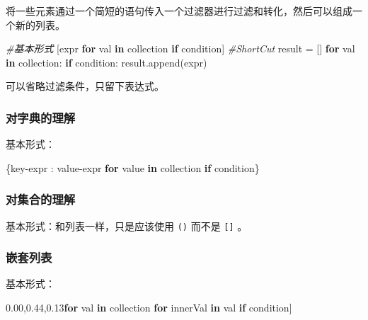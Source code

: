 \documentclass[utf-8]{ctexart}
\newenvironment{Shaded}{}{}
\newcommand{\KeywordTok}[1]{\textcolor[rgb]{0.00,0.44,0.13}{\textbf{#1}}}
\newcommand{\CommentTok}[1]{\textcolor[rgb]{0.38,0.63,0.69}{\textit{#1}}}
\newcommand{\ControlFlowTok}[1]{\textcolor[rgb]{0.00,0.44,0.13}{\textbf{#1}}}
\newcommand{\OperatorTok}[1]{\textcolor[rgb]{0.40,0.40,0.40}{#1}}
\newcommand{\NormalTok}[1]{#1}
\begin{document}
将一些元素通过一个简短的语句传入一个过滤器进行过滤和转化，然后可以组成一个新的列表。

\begin{Shaded}
\begin{Highlighting}[]
\CommentTok{#基本形式}
\NormalTok{[expr }\ControlFlowTok{for}\NormalTok{ val }\KeywordTok{in}\NormalTok{ collection }\ControlFlowTok{if}\NormalTok{ condition]}
\CommentTok{#ShortCut}
\NormalTok{result }\OperatorTok{=}\NormalTok{ []}
\ControlFlowTok{for}\NormalTok{ val }\KeywordTok{in}\NormalTok{ collection:}
  \ControlFlowTok{if}\NormalTok{ condition:}
\NormalTok{    result.append(expr)}
\end{Highlighting}
\end{Shaded}

可以省略过滤条件，只留下表达式。

\subsubsection{对字典的理解}\label{header-n378}

基本形式：

\begin{Shaded}
\begin{Highlighting}[]
\NormalTok{\{key}\OperatorTok{-}\NormalTok{expr : value}\OperatorTok{-}\NormalTok{expr }\ControlFlowTok{for}\NormalTok{ value }\KeywordTok{in}\NormalTok{ collection }\ControlFlowTok{if}\NormalTok{ condition\}}
\end{Highlighting}
\end{Shaded}

\subsubsection{对集合的理解}\label{header-n382}

基本形式：和列表一样，只是应该使用 \texttt{()} 而不是 \texttt{{[}{]}} 。

\subsubsection{嵌套列表}\label{header-n385}

基本形式：

\begin{Shaded}
\begin{Highlighting}[]
\NormalTok{[expr }\ControlFlowTok{for}\NormalTok{ val }\KeywordTok{in}\NormalTok{ collection }\ControlFlowTok{for}\NormalTok{ innerVal }\KeywordTok{in}\NormalTok{ val }\ControlFlowTok{if}\NormalTok{ condition]}
\end{Highlighting}
\end{Shaded}
\end{document}
